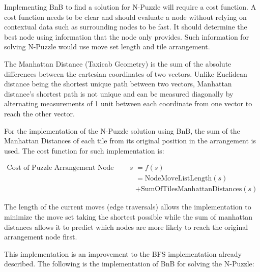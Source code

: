 \par Implementing BnB to find a solution for N-Puzzle will require a cost function. A cost function needs to be clear and should evaluate a node without relying on contextual data such as surrounding nodes to be fast. It should determine the best node using information that the node only provides. Such information for solving N-Puzzle would use move set length and tile arrangement.

\par The Manhattan Distance (Taxicab Geometry) is the sum of the absolute differences between the cartesian coordinates of two vectors. Unlike Euclidean distance being the shortest unique path between two vectors, Manhattan distance's shortest path is not unique and can be measured diagonally by alternating measurements of 1 unit between each coordinate from one vector to reach the other vector. \cite{mnh}

\par For the implementation of the N-Puzzle solution using BnB, the sum of the Manhattan Distances of each tile from its original position in the arrangement is used. The cost function for such implementation\cite{bnb}\cite{heur} is:

\begin{align*}
\text{Cost of Puzzle Arrangement Node (state)} s &= f(s) \\
&= \text{NodeMoveListLength}(s) \\
&+ \text{SumOfTilesManhattanDistances}(s)
\end{align*}

\par The length of the current moves (edge traversals) allows the implementation to minimize the move set taking the shortest possible while the sum of manhattan distances allows it to predict which nodes are more likely to reach the original arrangement node first.

\par This implementation is an improvement to the BFS implementation already described. The following is the implementation of BnB for solving the N-Puzzle:

